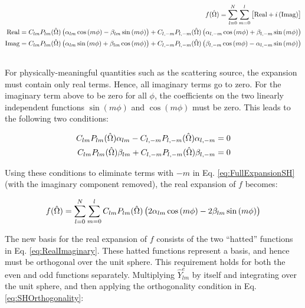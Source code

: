 \begin{tcolorbox}[breakable]
\begin{equation}
\label{eq:FullExpansionSH}
\begin{aligned}
f(\hat{\Omega}  )=\sum_{l=0}^{N}\sum_{m=0}^{l}\left[ \text{Real}+i\left(\text{Imag}\right)\right]\\
\text{Real} = C_{lm}P_{lm}(\hat{\Omega}  )\left(\alpha_{lm}\cos{(m\phi)}-\beta_{lm}\sin{(m\phi)}\right)+C_{l,-m}P_{l,-m}(\hat{\Omega}  )\left(\alpha_{l,-m}\cos{(m\phi)}+\beta_{l,-m}\sin{(m\phi)}\right)\\
\text{Imag} = C_{lm}P_{lm}(\hat{\Omega}  )\left(\alpha_{lm}\sin{(m\phi)}+\beta_{lm}\cos{(m\phi)}\right)+C_{l,-m}P_{l,-m}(\hat{\Omega}  )\left(\beta_{l,-m}\cos{(m\phi)}-\alpha_{l,-m}\sin{(m\phi)}\right)\\\
\end{aligned}
\end{equation}

For physically-meaningful quantities such as the scattering source, the expansion must contain only real terms. Hence, all imaginary terms go to zero. For the imaginary term above to be zero for all \(\phi\), the coefficients on the two linearly independent functions \(\sin{(m\phi)}\) and \(\cos{(m\phi)}\) must be zero. This leads to the following two conditions:

\begin{equation}
\begin{aligned}
C_{lm}P_{lm}(\hat{\Omega}  )\alpha_{lm}-C_{l,-m}P_{l,-m}(\hat{\Omega}  )\alpha_{l,-m}=0\\
C_{lm}P_{lm}(\hat{\Omega}  )\beta_{lm}+C_{l,-m}P_{l,-m}(\hat{\Omega}  )\beta_{l,-m}=0\\
\end{aligned}
\end{equation}

Using these conditions to eliminate terms with \(-m\) in Eq. \eqref{eq:FullExpansionSH} (with the imaginary component removed), the real expansion of \(f\) becomes:

\begin{equation}
\label{eq:FullExpansionSH2}
f(\hat{\Omega}  )=\sum_{l=0}^{N}\sum_{m=0}^{l}C_{lm}P_{lm}(\hat{\Omega}  )\left(2\alpha_{lm}\cos{(m\phi)}-2\beta_{lm}\sin{(m\phi)}\right)
\end{equation}

The new basis for the real expansion of \(f\) consists of the two ``hatted'' functions in Eq. \eqref{eq:RealImaginary}. These hatted functions represent a basis, and hence must be orthogonal over the unit sphere. This requirement holds for both the even and odd functions separately. Multiplying \(\hat{Y}_{lm}^e\) by itself and integrating over the unit sphere, and then applying the orthogonality condition in Eq. \eqref{eq:SHOrthogonality}:


\end{tcolorbox}
